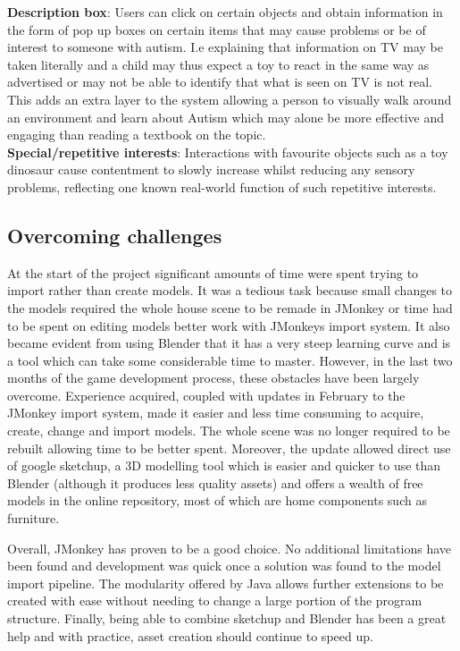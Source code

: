 \documentclass[11pt]{report}
\begin{document}
\textbf{Description box}: Users can click on certain objects and obtain information in the form of pop up boxes on certain items that may cause problems or be of interest to someone with autism. I.e explaining that information on
TV may be taken literally and a child may thus expect a toy to react in the same way as advertised or may not be able to identify that what is seen on TV is not real. This adds an extra layer to the system allowing a person
to visually walk around an environment and learn about Autism which may alone be more effective and engaging than reading a textbook on the topic. \\

\textbf{Special/repetitive interests}: Interactions with favourite objects such as a toy dinosaur cause contentment to slowly increase whilst reducing any sensory problems, reflecting one known real-world function of such repetitive interests.

\subsection{Overcoming challenges}
At the start of the project significant amounts of time were spent trying to import rather than create models. It was a tedious task because small changes to the models required the whole house scene to be remade in JMonkey or
time had to be spent on editing models better work with JMonkeys import system. It also became evident from using Blender that it has a very steep learning curve and is a tool which can take some considerable time to master.
However, in the last two months of the game development process, these obstacles have been largely overcome. Experience acquired, coupled with updates in February to the JMonkey import system, made it easier and less
time consuming to acquire, create, change and import models. The whole scene was no longer required to be rebuilt allowing time to be better spent. Moreover, the update allowed direct use of google sketchup, a 3D modelling
tool which is easier and quicker to use than Blender (although it produces less quality assets) and offers a wealth of free models in the online repository, most of which are home components such as furniture.

Overall, JMonkey has proven to be a good choice. No additional limitations have been found and development was quick once a solution was found to the model import pipeline. The modularity offered by Java allows
further extensions to be created with ease without needing to change a large portion of the program structure. Finally, being able to combine sketchup and Blender has been a great help and with practice, asset creation should
continue to speed up.
\end{document}
